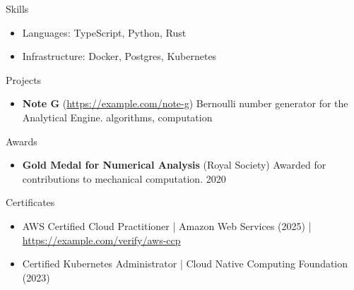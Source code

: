 \documentclass[]{mcdowellcv}
\begin{document}
\vspace{3pt}
\begin{cvsection}{Skills}
\begin{cvsubsection}{}{}{}
\begin{itemize}
\setlength\itemsep{2pt}
\item Languages:  TypeScript, Python, Rust
\item Infrastructure:  Docker, Postgres, Kubernetes
\end{itemize}
\end{cvsubsection}
\end{cvsection}
\vspace{3pt}
\begin{cvsection}{Projects}
\begin{cvsubsection}{}{}{}
\begin{itemize}
\setlength\itemsep{2pt}
\item \textbf{Note G} (\href{https://example.com/note-g}{https://example.com/note-g})  Bernoulli number generator for the Analytical Engine. algorithms, computation
\end{itemize}
\end{cvsubsection}
\end{cvsection}
\vspace{3pt}
\begin{cvsection}{Awards}
\begin{cvsubsection}{}{}{}
\begin{itemize}
\setlength\itemsep{2pt}
\item \textbf{Gold Medal for Numerical Analysis} (Royal Society)  Awarded for contributions to mechanical computation. 2020
\end{itemize}
\end{cvsubsection}
\end{cvsection}
\vspace{3pt}
\begin{cvsection}{Certificates}
\begin{cvsubsection}{}{}{}
\begin{itemize}
\setlength\itemsep{2pt}
\item AWS Certified Cloud Practitioner | Amazon Web Services (2025) | \href{https://example.com/verify/aws-ccp}{https://example.com/verify/aws-ccp}
\item Certified Kubernetes Administrator | Cloud Native Computing Foundation (2023)
\end{itemize}
\end{cvsubsection}
\end{cvsection}
      \ 
    
\end{document}
